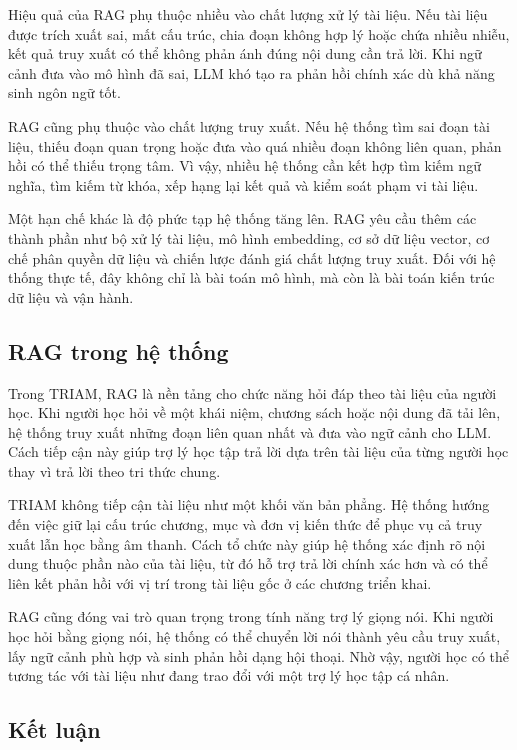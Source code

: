 \documentclass[12pt,a4paper]{report}
\begin{document}
Hiệu quả của RAG phụ thuộc nhiều vào chất lượng xử lý tài liệu. Nếu tài liệu được trích xuất sai, mất cấu trúc, chia đoạn không hợp lý hoặc chứa nhiều nhiễu, kết quả truy xuất có thể không phản ánh đúng nội dung cần trả lời. Khi ngữ cảnh đưa vào mô hình đã sai, LLM khó tạo ra phản hồi chính xác dù khả năng sinh ngôn ngữ tốt.

RAG cũng phụ thuộc vào chất lượng truy xuất. Nếu hệ thống tìm sai đoạn tài liệu, thiếu đoạn quan trọng hoặc đưa vào quá nhiều đoạn không liên quan, phản hồi có thể thiếu trọng tâm. Vì vậy, nhiều hệ thống cần kết hợp tìm kiếm ngữ nghĩa, tìm kiếm từ khóa, xếp hạng lại kết quả và kiểm soát phạm vi tài liệu.

Một hạn chế khác là độ phức tạp hệ thống tăng lên. RAG yêu cầu thêm các thành phần như bộ xử lý tài liệu, mô hình embedding, cơ sở dữ liệu vector, cơ chế phân quyền dữ liệu và chiến lược đánh giá chất lượng truy xuất. Đối với hệ thống thực tế, đây không chỉ là bài toán mô hình, mà còn là bài toán kiến trúc dữ liệu và vận hành.

\subsection{RAG trong hệ thống}

Trong TRIAM, RAG là nền tảng cho chức năng hỏi đáp theo tài liệu của người học. Khi người học hỏi về một khái niệm, chương sách hoặc nội dung đã tải lên, hệ thống truy xuất những đoạn liên quan nhất và đưa vào ngữ cảnh cho LLM. Cách tiếp cận này giúp trợ lý học tập trả lời dựa trên tài liệu của từng người học thay vì trả lời theo tri thức chung.

TRIAM không tiếp cận tài liệu như một khối văn bản phẳng. Hệ thống hướng đến việc giữ lại cấu trúc chương, mục và đơn vị kiến thức để phục vụ cả truy xuất lẫn học bằng âm thanh. Cách tổ chức này giúp hệ thống xác định rõ nội dung thuộc phần nào của tài liệu, từ đó hỗ trợ trả lời chính xác hơn và có thể liên kết phản hồi với vị trí trong tài liệu gốc ở các chương triển khai.

RAG cũng đóng vai trò quan trọng trong tính năng trợ lý giọng nói. Khi người học hỏi bằng giọng nói, hệ thống có thể chuyển lời nói thành yêu cầu truy xuất, lấy ngữ cảnh phù hợp và sinh phản hồi dạng hội thoại. Nhờ vậy, người học có thể tương tác với tài liệu như đang trao đổi với một trợ lý học tập cá nhân.

\subsection{Kết luận}
\end{document}
